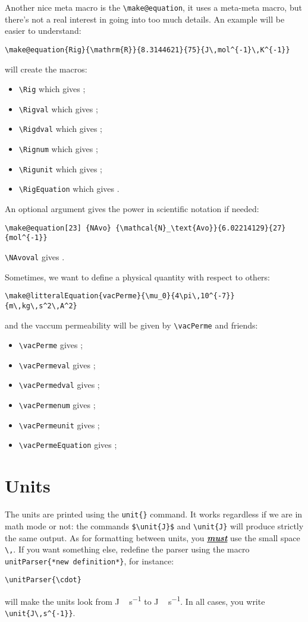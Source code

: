 \documentclass{documentation}
\begin{document}
Another nice meta macro is the \verb!\make@equation!, it uses a meta-meta macro,
but there's not a real interest in going into too much details. An example
will be easier to understand:
\begin{verbatim}
\make@equation{Rig}{\mathrm{R}}{8.3144621}{75}{J\,mol^{-1}\,K^{-1}}
\end{verbatim}
will create the macros:
\begin{itemize}
\item \verb!\Rig!     which gives \Rig;
\item \verb!\Rigval!  which gives \Rigval;
\item \verb!\Rigdval! which gives \Rigdval;
\item \verb!\Rignum!  which gives \Rignum;
\item \verb!\Rigunit! which gives \Rigunit;
\item \verb!\RigEquation! which gives \RigEquation.
\end{itemize}
An optional argument gives the power in scientific notation if needed:
\begin{verbatim}
\make@equation[23] {NAvo} {\mathcal{N}_\text{Avo}}{6.02214129}{27}{mol^{-1}}
\end{verbatim}
\verb!\NAvoval! gives \NAvoval.

Sometimes, we want to define a physical quantity with respect to others:
\begin{verbatim}
\make@litteralEquation{vacPerme}{\mu_0}{4\pi\,10^{-7}}{m\,kg\,s^2\,A^2}
\end{verbatim}
and the vaccum permeability will be given by \verb!\vacPerme! and friends:
\begin{itemize}
\item \verb!\vacPerme!         gives \vacPerme;
\item \verb!\vacPermeval!      gives \vacPermeval;
\item \verb!\vacPermedval!     gives \vacPermedval;
\item \verb!\vacPermenum!      gives \vacPermenum;
\item \verb!\vacPermeunit!     gives \vacPermeunit;
\item \verb!\vacPermeEquation! gives \vacPermeEquation;
\end{itemize}

\section{Units}

The units are printed using the \verb!unit{}! command. It
works regardless if we are in math mode or not: the
commands \verb!$\unit{J}$! and \verb!\unit{J}! will produce
strictly the same output. As for formatting between units,
you \emph{\underline{\textbf{must}}} use  the small space \verb!\,!. If you want something
else, redefine the parser using the macro \verb!unitParser{*new definition*}!,
for instance:
\begin{verbatim}
\unitParser{\cdot}
\end{verbatim}
will make the units look from \unit{J\,s^{-1}} to
{\unitParser{\cdot}
\unit{J\,s^{-1}}}. In all cases, you write \verb!\unit{J\,s^{-1}}!.
\end{document}
